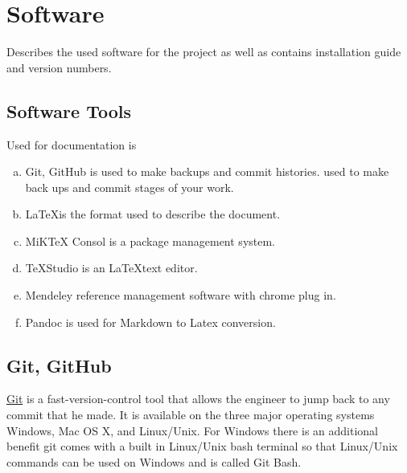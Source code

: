 \section{Software} \label{sec: software}
Describes the used software for the project as well as contains installation guide and version numbers.

\subsection{Software Tools}\label{subsec: software_tools}
Used for documentation is 
\begin{enumerate}[(a)]%
	\item Git, GitHub is used to make backups and commit histories.
	used to make back ups and commit stages of your work.
	\item \LaTeX is the format used to describe the document.
	\item MiK\TeX \cite{MikTex} Consol is a package management system.
	\item \TeX Studio \cite{TexStudio} is an \LaTeX text editor.
	\item Mendeley \cite{Mendeley} reference management software with chrome plug in.
	\item Pandoc is used for Markdown to Latex conversion.	
	
\end{enumerate}

\subsection{Git, GitHub}\label{subsec: install_git}
\href{https://git-scm.com/downloads}{Git} is a fast-version-control tool that  allows the engineer to jump back to any commit that he made. It is available on the three major operating systems Windows, Mac OS X, and Linux/Unix. For Windows there is an additional benefit git comes with a built in Linux/Unix bash terminal so that Linux/Unix commands can be used on Windows and is called Git Bash.


